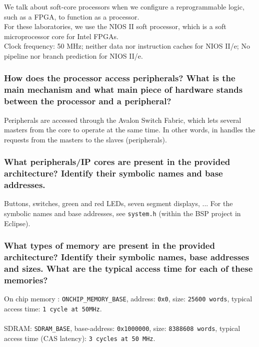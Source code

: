\documentclass[a4paper,10pt]{article}
\begin{document}
We talk about soft-core processors when we configure a reprogrammable logic, such as a FPGA, to function as a processor. \\
For these laboratories, we use the NIOS II soft processor, which is a soft microprocessor core for Intel FPGAs.\\
Clock frequency: 50 MHz; neither data nor instruction caches for NIOS  II/e; No pipeline nor branch prediction for NIOS II/e.

\subsubsection{How does the processor access peripherals? What is the main mechanism and what main piece of hardware stands between the processor and a peripheral?} 

Peripherals are accessed through the Avalon Switch Fabric, which lets several masters from the core to operate at the same time. In other words, in handles the requests from the masters to the slaves (peripherals).

\subsubsection{What peripherals/IP cores are present in the provided architecture? Identify their symbolic names and base addresses.}

Buttons, switches, green and red LEDs, seven segment displays, ...
For the symbolic names and base addresses, see \texttt{system.h} (within the BSP project in Eclipse).

\subsubsection{What types of memory are present in the provided architecture? Identify their symbolic names, base addresses and sizes. What are the typical access time for each of these memories?}

On chip memory : \texttt{ONCHIP\_MEMORY\_BASE}, address: \texttt{0x0}, size: \texttt{25600 words}, typical access time: \texttt{1 cycle at 50MHz}.\\
\\
SDRAM: \texttt{SDRAM\_BASE}, base-address: \texttt{0x1000000}, size: \texttt{8388608 words}, typical access time (CAS latency): \texttt{3 cycles at 50 MHz}.
\end{document}
